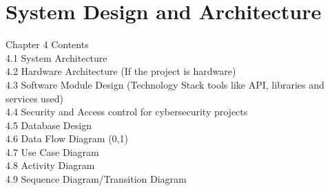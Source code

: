 \chapter{System Design and Architecture}\thispagestyle{thesisstyle} %
\graphicspath{{Chapter4/figures/}}
{
	
	



Chapter 4 Contents\\



4.1 System Architecture \\
4.2 Hardware Architecture (If the project is hardware)\\
4.3 Software Module Design (Technology Stack tools like API, libraries and services used) \\
4.4 Security and Access control for cybersecurity projects \\
4.5 Database Design \\
4.6 Data Flow Diagram (0,1)\\
4.7 Use Case Diagram \\
4.8 Activity Diagram \\
4.9 Sequence Diagram/Transition Diagram\\






}